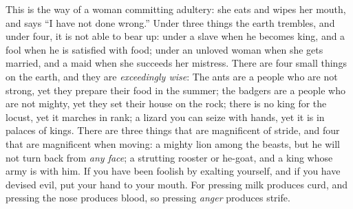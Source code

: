 \begin{biblechapter}
\verse This is the way of a woman committing adultery: 
she eats and wipes her mouth, 
and says “I have not done wrong.”
\verse Under three things the earth trembles, 
and under four, it is not able to bear up:
\verse under a slave when he becomes king, 
and a fool when he is satisfied with food;
\verse under an unloved woman when she gets married, 
and a maid when she succeeds her mistress.
\verse There are four small things on the earth, 
and they are \textit{exceedingly wise}:
\verse The ants are a people who are not strong, 
yet they prepare their food in the summer;
\verse the badgers are a people who are not mighty, 
yet they set their house on the rock;
\verse there is no king for the locust, 
yet it marches in rank;
\verse a lizard you can seize with hands, 
yet it is in palaces of kings.
\verse There are three things that are magnificent of stride, 
and four that are magnificent when moving:
\verse a mighty lion among the beasts, 
but he will not turn back from \textit{any face};
\verse a strutting rooster or he-goat, 
and a king whose army is with him.
\verse If you have been foolish by exalting yourself, 
and if you have devised evil, put your hand to your mouth.
\verse For pressing milk produces curd, 
and pressing the nose produces blood, 
so pressing \textit{anger} produces strife.
\end{biblechapter}

